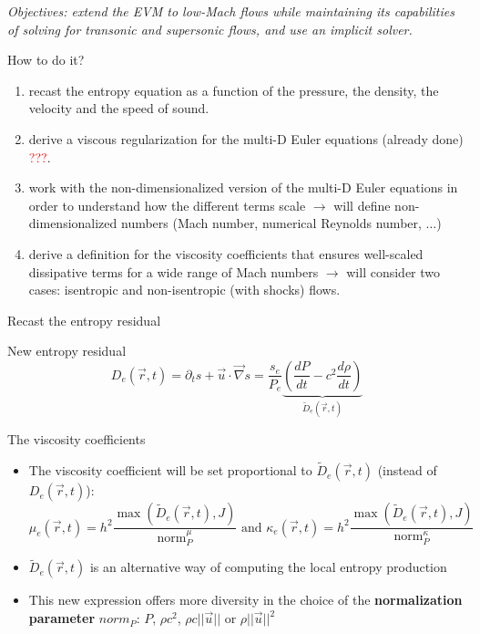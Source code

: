 \documentclass[xcolor=dvipsnames,10pt]{beamer}
\newcommand{\grad}{\vec{\nabla}}
\newcommand{\norm}{\textrm{norm}}
\newcommand{\tcr}[1]{\textcolor{red}{#1}}
\begin{document}
\begin{frame}
\emph{Objectives: extend the EVM to low-Mach flows while maintaining its capabilities of solving for transonic and supersonic flows, and use an implicit solver.}
\begin{block}{How to do it?}
\begin{enumerate}
\setlength{\itemsep}{10pt}
\item recast the entropy equation as a function of the pressure, the density, the velocity and the speed of sound.
\item derive a viscous regularization for the multi-D Euler equations (already done) \tcr{???}.
\item work with the non-dimensionalized version of the multi-D Euler equations in order to understand how the different terms scale $\to$ will define non-dimensionalized numbers (Mach number, numerical Reynolds number, $\dots$)
\item derive a definition for the viscosity coefficients that ensures well-scaled dissipative terms for a wide range of Mach numbers $\to$ will consider two cases: isentropic and non-isentropic (with shocks) flows.
\end{enumerate}
\end{block}
\end{frame}
\begin{frame}{Recast the entropy residual}
\begin{block}{New entropy residual}
\begin{equation}
D_e(\vec{r},t) = \partial_t s + \vec{u} \cdot \grad s = \frac{s_e}{P_e} \underbrace{\left( \frac{d P}{dt} - c^2 \frac{d \rho}{dt} \right)}_{\tilde{D}_e(\vec{r},t)} \nonumber
\end{equation}
\end{block}
\begin{block}{The viscosity coefficients}
\begin{itemize}
\item The viscosity coefficient will be set proportional to $\tilde{D}_e(\vec{r},t)$ (instead of $D_e(\vec{r},t)$):
\begin{equation}
\mu_e(\vec{r},t) = h^2 \frac{\max \left( \tilde{D}_e(\vec{r},t), J \right)}{\norm_P^\mu} \text{ and }\kappa_e(\vec{r},t) = h^2 \frac{\max \left( \tilde{D}_e(\vec{r},t), J \right)}{\norm_P^\kappa} \nonumber
\end{equation}
\item $\tilde{D}_e(\vec{r},t)$ is an alternative way of computing the local entropy production
\item This new expression offers more diversity in the choice of the \textbf{normalization parameter} $norm_P$: $P$, $\rho c^2$, $\rho c ||\vec{u} ||$ or  $\rho ||\vec{u}||^2$
\end{itemize}
\end{block}
\end{frame}
\end{document}
